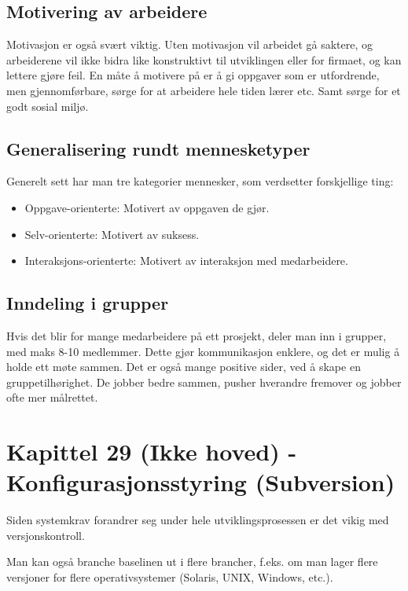 \documentclass[11pt]{article}
\begin{document}
\subsection{Motivering av arbeidere}
\label{sec-15.2}

   Motivasjon er også svært viktig. Uten motivasjon vil arbeidet gå saktere, 
   og arbeiderene vil ikke bidra like konstruktivt til utviklingen eller for 
   firmaet, og kan lettere gjøre feil. En måte å motivere på er å gi oppgaver 
   som er utfordrende, men gjennomførbare, sørge for at arbeidere hele tiden 
   lærer etc. Samt sørge for et godt sosial miljø.
\subsection{Generalisering rundt mennesketyper}
\label{sec-15.3}

   Generelt sett har man tre kategorier mennesker, som verdsetter forskjellige ting:

\begin{itemize}
\item Oppgave-orienterte: 
     Motivert av oppgaven de gjør.
\item Selv-orienterte: 
     Motivert av suksess.
\item Interaksjons-orienterte: 
     Motivert av interaksjon med medarbeidere.
\end{itemize}
\subsection{Inndeling i grupper}
\label{sec-15.4}

   Hvis det blir for mange medarbeidere på ett prosjekt, deler man inn i grupper, 
   med maks 8-10 medlemmer. Dette gjør kommunikasjon enklere, og det er mulig å 
   holde ett møte sammen. Det er også mange positive sider, ved å skape en gruppetilhørighet. 
   De jobber bedre sammen, pusher hverandre fremover og jobber ofte mer målrettet.
\section{Kapittel 29 (Ikke hoved) - Konfigurasjonsstyring (Subversion)}
\label{sec-16}

  Siden systemkrav forandrer seg under hele utviklingsprosessen er det vikig med versjonskontroll. 
  
  Man kan også branche baselinen ut i flere brancher, f.eks. om man lager flere versjoner for 
  flere operativsystemer (Solaris, UNIX, Windows, etc.). 
  
\end{document}
